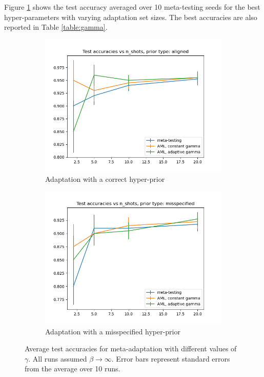 \documentclass{article}
\theoremstyle{definition}
\begin{document}
Figure \ref{fig:results-gamma} shows the test accuracy averaged over 10 meta-testing seeds for the best hyper-parameters with varying adaptation set sizes. The best accuracies are also reported in Table \ref{table:gamma}.


\begin{figure}[h!]
	\centering
	\begin{subfigure}[b]{0.49\textwidth}
		\centering
		\includegraphics[width=\textwidth]{test_accuracies_model_aligned}
		\caption{Adaptation with a correct hyper-prior}
	\end{subfigure}
	\hfill
	\begin{subfigure}[b]{0.49\textwidth}
		\centering
		\includegraphics[width=\textwidth]{test_accuracies_model_misspecified}
		\caption{Adaptation with a misspecified hyper-prior}	 	
	\end{subfigure}
	\hfill
	\caption{Average test accuracies for meta-adaptation with different values of $\gamma$. All runs assumed $\beta\rightarrow\infty$. Error bars represent standard errors from the average over 10 runs.}	 
	\label{fig:results-gamma}
\end{figure}
\end{document}
